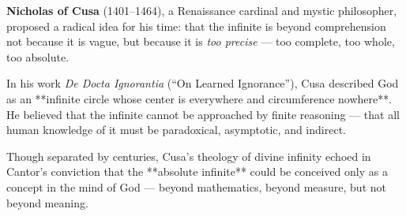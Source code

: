 \begin{tcolorbox}[colback=gray!5!white, colframe=black!80!white, title={Historical Sidenote: Nicholas of Cusa and the Paradox of the Infinite}]

  \textbf{Nicholas of Cusa} (1401–1464), a Renaissance cardinal and mystic philosopher, proposed a radical idea for his time: that the infinite is beyond comprehension not because it is vague, but because it is \textit{too precise} — too complete, too whole, too absolute.
  
  In his work \textit{De Docta Ignorantia} (“On Learned Ignorance”), Cusa described God as an **infinite circle whose center is everywhere and circumference nowhere**. He believed that the infinite cannot be approached by finite reasoning — that all human knowledge of it must be paradoxical, asymptotic, and indirect.
  
  \medskip
  
  Though separated by centuries, Cusa’s theology of divine infinity echoed in Cantor’s conviction that the **absolute infinite** could be conceived only as a concept in the mind of God — beyond mathematics, beyond measure, but not beyond meaning.
  
\end{tcolorbox}


